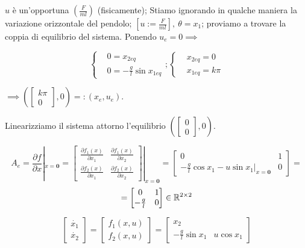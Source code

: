 $u$ è un'opportuna $(\frac{F}{ml})$ (fisicamente); Stiamo ignorando in qualche maniera la variazione orizzontale del pendolo; $[u := \frac{F}{ml}],\ \theta = x_1$; proviamo a trovare la coppia di equilibrio del sistema. Ponendo $u_e = 0 \implies$

\[
	\left\{
	\begin{aligned}
	&0 = x_{2eq} \\
	&0 = -\frac{g}{l}\sin{x_{1eq}}
	\end{aligned} 
	\right. ; \left\{
	\begin{aligned}
	&x_{2eq} = 0 \\
	&x_{1eq} = k\pi
	\end{aligned} 
	\right.
\]

$\implies (\begin{bmatrix}k\pi\\0\end{bmatrix}, 0) =: (x_e,u_e)$. 

Linearizziamo il sistema attorno l'equilibrio $(\begin{bmatrix}0\\0\end{bmatrix}, 0)$.

\[
	A_e = \frac{\partial{f}}{\partial{x}}|_{x=\mathbf{0}} = \begin{bmatrix}
	\frac{\partial{f_1(x)}}{\partial{x_1}} & \frac{\partial{f_1(x)}}{\partial{x_2}} \\
	\frac{\partial{f_2(x)}}{\partial{x_1}} & \frac{\partial{f_2(x)}}{\partial{x_2}}\end{bmatrix}|_{x=\mathbf{0}} = \begin{bmatrix}
	0 & 1 \\
	-\frac{g}{l}\cos{x_1} - u\sin{x_1}|_{x=\mathbf{0}} & 0\end{bmatrix} = 
\]
\[
	 = \begin{bmatrix}
	 0 & 1 \\
	 -\frac{g}{l} & 0\end{bmatrix} \in \mathbb{R}^{2 \times 2}
\]

\[
	\begin{bmatrix}\dot{x_1}\\ \dot{x_2}\end{bmatrix} = \begin{bmatrix}f_1(x,u)\\f_2(x,u)\end{bmatrix} =
	\begin{bmatrix}x_2\\-\frac{g}{l}\sin{x_1} & u\cos{x_1}\end{bmatrix}
\]

